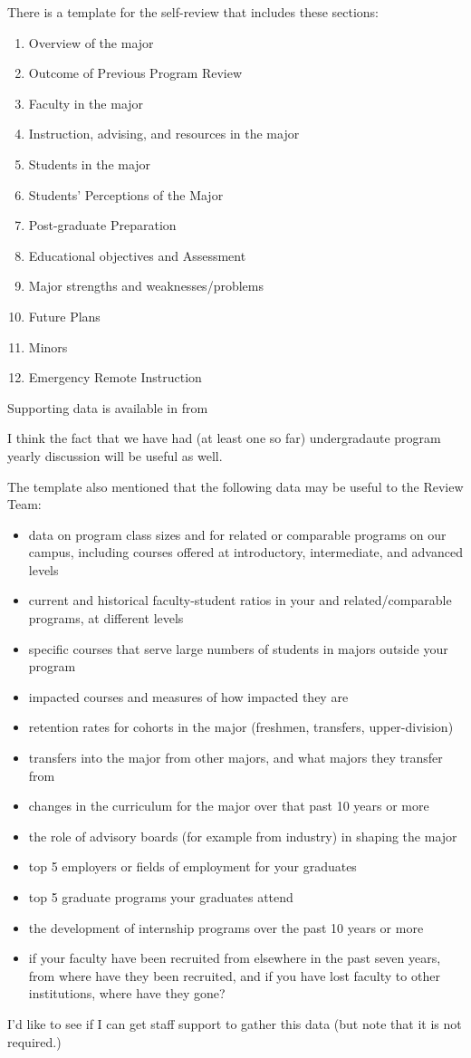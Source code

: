\documentclass[12pt]{article}
\begin{document}
There is a template for the self-review that includes these sections:
\begin{enumerate} 
 \item Overview of the major
 \item Outcome of Previous Program Review
 \item Faculty in the major
 \item Instruction, advising, and resources in the major
 \item Students in the major
 \item Students’ Perceptions of the Major
 \item Post-graduate Preparation
 \item Educational objectives and Assessment
 \item Major strengths and weaknesses/problems
 \item Future Plans
 \item Minors
 \item Emergency Remote Instruction
\end{enumerate}
Supporting data is available in from




I think the fact that we have had (at least one so far) undergradaute program yearly discussion will be useful as well.

The template also mentioned that the following data may be useful to the Review Team:
\begin{itemize}
\item data on program class sizes and for related or comparable programs on our campus, including courses offered at introductory, intermediate, and advanced levels
\item current and historical faculty-student ratios in your and related/comparable programs, at different levels
\item specific courses that serve large numbers of students in majors outside your program
\item impacted courses and measures of how impacted they are
\item retention rates for cohorts in the major (freshmen, transfers, upper-division)
\item transfers into the major from other majors, and what majors they transfer from
\item changes in the curriculum for the major over that past 10 years or more
\item the role of advisory boards (for example from industry) in shaping the major
\item top 5 employers or fields of employment for your graduates
\item top 5 graduate programs your graduates attend
\item the development of internship programs over the past 10 years or more
\item if your faculty have been recruited from elsewhere in the past seven years, from where have they been recruited, and if you have lost faculty to other institutions, where have they gone?
\end{itemize}
I'd like to see if I can get staff support to gather this data (but note that it is not required.)
\end{document}

